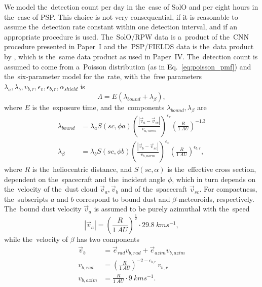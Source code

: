 We model the~detection count per day in the~case of SolO and per eight hours in the~case of PSP. This choice is not very consequential, if it is reasonable to assume the~detection rate constant within one detection interval, and if an appropriate procedure is used. The~SolO/RPW data is a~product of the~CNN procedure presented in Paper~I and the~PSP/FIELDS data is the~data product by \citet{malaspina2023dust}, which is the~same data product as used in Paper~IV. The~detection count is assumed to come from a~Poisson distribution (as in Eq.~\ref{eq:poisson_pmf}) and the~six-parameter model for the~rate, with the~free parameters $\lambda_a, \lambda_b, v_{b,r}, \epsilon_v, \epsilon_{b,r}, \alpha_{shield}$ is 
\begin{equation}
    \Lambda = E (\lambda_{bound} + \lambda_{\beta}),
\end{equation}
where $E$ is the~exposure time, and the~components $\lambda_{bound},\lambda_{\beta}$ are
\begin{equation}\begin{split}
    \lambda_{bound} &= \lambda_a  S(sc,\phi{a}) \left( \frac{|\vec{v}_{a} - \vec{v}_{sc}|}{v_{a,norm}}\right)^{\epsilon_v} \left( \frac{R}{\SI{1}{AU}} \right)^{-1.3} \\
    \lambda_{\beta} &= \lambda_b S(sc,\phi{b}) \left( \frac{|\vec{v}_{b} - \vec{v}_{sc}|}{v_{b,norm}}\right)^{\epsilon_v} \left( \frac{R}{\SI{1}{AU}} \right)^{\epsilon_{b,r}},
\end{split}\end{equation}
where $R$ is the~heliocentric distance, and $S(sc,\alpha)$ is the~effective cross section, dependent on the~spacecraft and the~incident angle $\phi$, which in turn depends on the~velocity of the~dust cloud $\vec{v}_a,\vec{v}_b$ and of the~spacecraft $\vec{v}_{sc}$. For compactness, the~subscripts $a$ and $b$ correspond to bound dust and $\beta$-meteoroids, respectively. The~bound dust velocity $\vec{v}_a$ is assumed to be purely azimuthal with the~speed
\begin{equation}
    |\vec{v}_a| = \left( \frac{R}{\SI{1}{AU}} \right)^\frac{1}{2} \cdot \SI{29.8}{kms^{-1}},
\end{equation}
while the~velocity of $\beta$ has two components
\begin{equation}\begin{split}
    \vec{v}_b &= \vec{e}_{rad} v_{b,rad} + \vec{e}_{azim} v_{b,azim} \\
    v_{b,rad} &= \left( \frac{R}{\SI{1}{AU}} \right)^{-2-\epsilon_{b,r}} \, v_{b,r} \\
    v_{b,azim} &= \frac{R}{\SI{1}{AU}} \cdot \SI{9}{kms^{-1}}.
\end{split}\end{equation}
